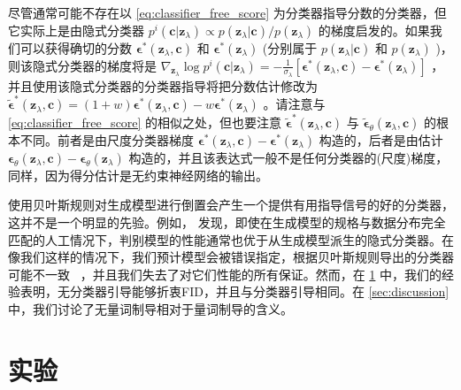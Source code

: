\documentclass{article}
\newcommand{\bc}{\mathbf{c}}
\newcommand{\bz}{\mathbf{z}}
\newcommand{\bepsilon}{{\boldsymbol{\epsilon}}}
\begin{document}
尽管通常可能不存在以 \cref{eq:classifier_free_score} 为分类器指导分数的分类器，但它实际上是由隐式分类器 $p^{i}(\bc | \bz_\lambda) \propto p(\bz_\lambda | \bc)/p(\bz_\lambda)$ 的梯度启发的。如果我们可以获得确切的分数 $\bepsilon^*(\bz_\lambda, \bc)$ 和 $\bepsilon^*(\bz_\lambda)$ (分别属于 $p(\bz_\lambda|\bc)$ 和 $p(\bz_\lambda)$ )，则该隐式分类器的梯度将是 $\nabla_{\bz_\lambda} \log p^{i}(\bc | \bz_\lambda) = -\frac{1}{\sigma_{\lambda}}[\bepsilon^*(\bz_\lambda, \bc) - \bepsilon^*(\bz_\lambda)]$ ，并且使用该隐式分类器的分类器指导将把分数估计修改为 $\tilde{\bepsilon}^*(\bz_\lambda, \bc) = (1+w)\bepsilon^*(\bz_\lambda, \bc) - w\bepsilon^*(\bz_\lambda)$ 。请注意与 \cref{eq:classifier_free_score} 的相似之处，但也要注意 $\tilde{\bepsilon}^*(\bz_\lambda,\bc)$ 与 $\tilde{\bepsilon}_\theta(\bz_\lambda,\bc)$ 的根本不同。前者是由尺度分类器梯度 $\bepsilon^*(\bz_\lambda, \bc) - \bepsilon^*(\bz_\lambda)$ 构造的，后者是由估计 $\bepsilon_\theta(\bz_\lambda, \bc) - \bepsilon_\theta(\bz_\lambda)$ 构造的，并且该表达式一般不是任何分类器的(尺度)梯度，同样，因为得分估计是无约束神经网络的输出。


使用贝叶斯规则对生成模型进行倒置会产生一个提供有用指导信号的好的分类器，这并不是一个明显的先验。例如， \cite{grandvalet2004semi} 发现，即使在生成模型的规格与数据分布完全匹配的人工情况下，判别模型的性能通常也优于从生成模型派生的隐式分类器。在像我们这样的情况下，我们预计模型会被错误指定，根据贝叶斯规则导出的分类器可能不一致~ \citep{grunwald2007suboptimal} ，并且我们失去了对它们性能的所有保证。然而，在 \cref{sec:experiments} 中，我们的经验表明，无分类器引导能够折衷FID，并且与分类器引导相同。在 \cref{sec:discussion} 中，我们讨论了无量词制导相对于量词制导的含义。


 \section{
实验} 
 \label{sec:experiments} 
\end{document}
